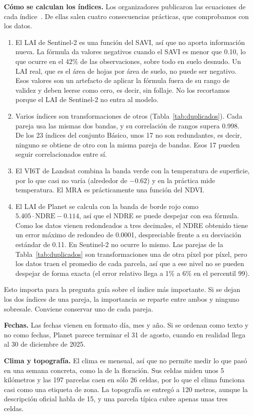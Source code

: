 \textbf{Cómo se calculan los índices.} Los organizadores publicaron las ecuaciones de cada índice~\cite{ecuaciones}. De ellas salen cuatro consecuencias prácticas, que comprobamos con los datos.
\begin{enumerate}
  \item El LAI de Sentinel-2 es una función del SAVI, así que no aporta información nueva. La fórmula da valores negativos cuando el SAVI es menor que 0.10, lo que ocurre en el 42\% de las observaciones, sobre todo en suelo desnudo. Un LAI real, que es el área de hojas por área de suelo, no puede ser negativo. Esos valores son un artefacto de aplicar la fórmula fuera de su rango de validez y deben leerse como cero, es decir, sin follaje. No los recortamos porque el LAI de Sentinel-2 no entra al modelo.
  \item Varios índices son transformaciones de otros (Tabla~\ref{tab:duplicados}). Cada pareja usa las mismas dos bandas, y su correlación de rangos supera 0.998. De los 23 índices del conjunto Básico, unos 17 no son redundantes, es decir, ninguno se obtiene de otro con la misma pareja de bandas. Esos 17 pueden seguir correlacionados entre sí.
  \item El VI6T de Landsat combina la banda verde con la temperatura de superficie, por lo que casi no varía (alrededor de $-0.62$) y en la práctica mide temperatura. El MRA es prácticamente una función del NDVI.
  \item El LAI de Planet se calcula con la banda de borde rojo como $5.405\cdot\mathrm{NDRE}-0.114$, así que el NDRE se puede despejar con esa fórmula. Como los datos vienen redondeados a tres decimales, el NDRE obtenido tiene un error máximo de redondeo de 0.0001, despreciable frente a su desviación estándar de 0.11. En Sentinel-2 no ocurre lo mismo. Las parejas de la Tabla~\ref{tab:duplicados} son transformaciones una de otra píxel por píxel, pero los datos traen el promedio de cada parcela, así que a ese nivel no se pueden despejar de forma exacta (el error relativo llega a 1\% a 6\% en el percentil 99).
\end{enumerate}
Esto importa para la pregunta guía sobre el índice más importante. Si se dejan los dos índices de una pareja, la importancia se reparte entre ambos y ninguno sobresale. Conviene conservar uno de cada pareja.

\textbf{Fechas.} Las fechas vienen en formato día, mes y año. Si se ordenan como texto y no como fechas, Planet
parece terminar el 31 de agosto, cuando en realidad llega al 30 de diciembre de 2025.

\textbf{Clima y topografía.} El clima es mensual, así que no permite medir lo que pasó en una semana concreta, como
la de la floración. Sus celdas miden unos 5 kilómetros y las 197 parcelas caen en sólo 26 celdas, por lo que el
clima funciona casi como una etiqueta de zona. La topografía se entregó a 120 metros, aunque la descripción oficial
habla de 15, y una parcela típica cubre apenas unas tres celdas.
